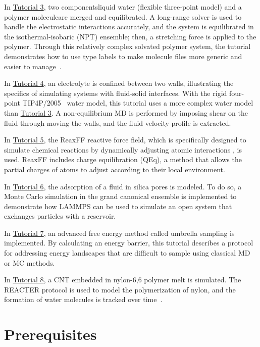 \documentclass[9pt,tutorial]{livecoms}
\begin{document}
In \hyperref[all-atom-label]{Tutorial 3}, two components\textemdash liquid water
(flexible three-point model) and a polymer molecule\textemdash are merged and
equilibrated.  A long-range solver is used to handle the electrostatic
interactions accurately, and the system is equilibrated in the
isothermal-isobaric (NPT) ensemble; then, a stretching force is applied
to the polymer.  Through this relatively complex solvated polymer
system, the tutorial demonstrates how to use type labels to make
molecule files more generic and easier to manage~\cite{gissinger2024type}.

In \hyperref[sheared-confined-label]{Tutorial 4}, an electrolyte is
confined between two walls, illustrating the specifics of simulating
systems with fluid-solid interfaces.  With the rigid four-point
TIP4P/2005~\cite{abascal2005general} water model, this tutorial uses a
more complex water model than \hyperref[all-atom-label]{Tutorial 3}.  A
non-equilibrium MD is performed by imposing shear on the fluid through
moving the walls, and the fluid velocity profile is extracted.

In \hyperref[reactive-silicon-dioxide-label]{Tutorial 5}, the ReaxFF
reactive force field, which is specifically designed to simulate chemical
reactions by dynamically adjusting atomic interactions
\cite{van2001reaxff}, is used.  ReaxFF includes charge equilibration (QEq), a
method that allows the partial charges of atoms to adjust according to
their local environment.

In \hyperref[gcmc-silica-label]{Tutorial 6}, the adsorption of a fluid in
silica pores is modeled.  To do so, a Monte Carlo simulation in
the grand canonical ensemble is implemented to demonstrate how LAMMPS
can be used to simulate an open system that exchanges particles with a
reservoir.

In \hyperref[umbrella-sampling-label]{Tutorial 7}, an advanced free
energy method called umbrella sampling is implemented.  By calculating
an energy barrier, this tutorial describes a protocol
for addressing energy landscapes that are difficult to sample using
classical MD or MC methods.

In \hyperref[bond-react-label]{Tutorial 8}, a CNT embedded in
nylon-6,6 polymer melt is simulated.  The
REACTER protocol is used to model the polymerization of nylon, and the formation
of water molecules is tracked over time~\cite{gissinger2020reacter}.

\section{Prerequisites}
\end{document}
